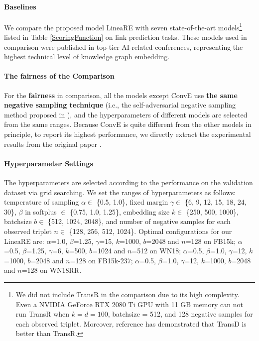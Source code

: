 \documentclass[conference]{IEEEtran}
\begin{document}
\paragraph*{Baselines}
We compare the proposed model LineaRE with seven state-of-the-art models\footnote{
	We did not include TransR in the comparison due to its high complexity. Even a NVIDIA GeForce RTX 2080 Ti GPU with 11 GB memory can not run TransR when $k=d=100$, batchsize = 512, and 128 negative samples for each observed triplet. Moreover, reference \cite{TransD} has demonstrated that TransD is better than TransR.
} listed in Table \ref{ScoringFunction} on link prediction tasks. These models used in comparison were published in top-tier AI-related conferences, representing the highest technical level of knowledge graph embedding.

\paragraph*{The fairness of the Comparison}
For the \textbf{fairness} in comparison, all the models except ConvE use \textbf{the same negative sampling technique} (i.e., the self-adversarial negative sampling method proposed in \cite{RotatE}), and the hyperparameters of different models are selected from the same ranges. Because ConvE is quite different from the other models in principle, to report its highest performance, we directly extract the experimental results from the original paper \cite{ConvE}.

\paragraph*{Hyperparameter Settings}
The hyperparameters are selected according to the performance on the validation dataset via grid searching. We set the ranges of hyperparameters as follows: temperature of sampling $\alpha \in$ \{0.5, 1.0\}, fixed margin $\gamma \in$ \{6, 9, 12, 15, 18, 24, 30\}, $\beta$ in softplus $\in$ \{0.75, 1.0, 1.25\}, embedding size $k \in$ \{250, 500, 1000\}, batchsize $b \in$ \{512, 1024, 2048\}, and number of negative samples for each observed triplet $n \in$ \{128, 256, 512, 1024\}. Optimal configurations for our LineaRE are: $\alpha$=1.0, $\beta$=1.25, $\gamma$=15, $k$=1000, $b$=2048 and $n$=128 on FB15k; $\alpha$=0.5, $\beta$=1.25, $\gamma$=6, $k$=500, $b$=1024 and $n$=512 on WN18; $\alpha$=0.5, $\beta$=1.0, $\gamma$=12, $k$=1000, $b$=2048 and $n$=128 on FB15k-237; $\alpha$=0.5, $\beta$=1.0, $\gamma$=12, $k$=1000, $b$=2048 and $n$=128 on WN18RR.
\end{document}
